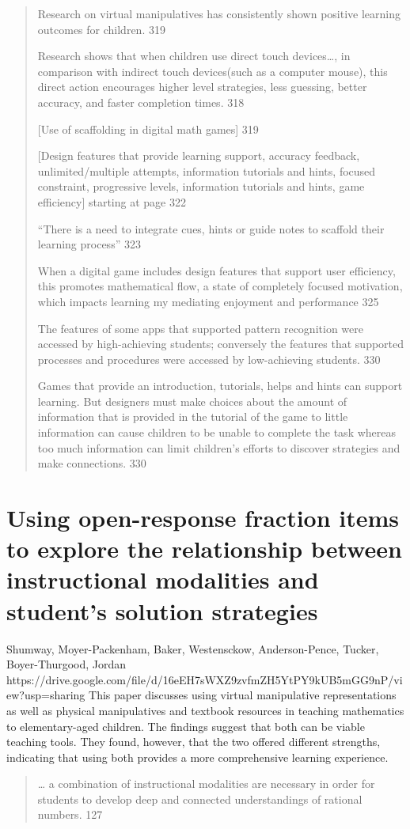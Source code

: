 \documentclass[12pt]{extarticle}
\begin{document}
\begin{quote}
    
    Research on virtual manipulatives has consistently shown positive learning outcomes for children. 319	
    
    Research shows that when children use direct touch devices…, in comparison with indirect touch devices(such as a computer mouse), this direct action encourages higher level strategies, less guessing, better accuracy, and faster completion times. 318
    
    [Use of scaffolding in digital math games] 319
    
    [Design features that provide learning support, accuracy feedback, unlimited/multiple attempts, information tutorials and hints, focused constraint, progressive levels, information tutorials and hints, game efficiency] starting at page 322
    
    “There is a need to integrate cues, hints or guide notes to scaffold their learning process” 323
    
    When a digital game  includes design features that support user efficiency, this promotes mathematical flow, a state of completely focused motivation, which impacts learning my mediating enjoyment and performance 325
    
    The features of some apps that supported pattern recognition were accessed by high-achieving students; conversely the features that supported processes and procedures were accessed by low-achieving students. 	330
    
    Games that provide an introduction, tutorials, helps and hints can support learning. But designers must make choices about the amount of information that is provided in the tutorial of the game to little information can cause children to be unable to complete the task whereas too much information can limit children’s efforts to discover strategies and make connections.	330
\end{quote}    

\section{Using open-response fraction items to explore the relationship between instructional modalities and student’s solution strategies}
Shumway, Moyer-Packenham, Baker, Westensckow, Anderson-Pence, Tucker, Boyer-Thurgood, Jordan 
https://drive.google.com/file/d/16eEH7sWXZ9zvfmZH5YtPY9kUB5mGG9nP/view?usp=sharing 
This paper discusses using virtual manipulative representations as well as physical manipulatives and textbook resources in teaching mathematics to elementary-aged children. The findings suggest that both can be viable teaching tools. They found, however, that the two offered different strengths, indicating that using both provides a more comprehensive learning experience.
\begin{quote}
    … a combination of instructional modalities are necessary in order for students to develop deep and connected understandings of rational numbers. 127
\end{quote}
\end{document}
